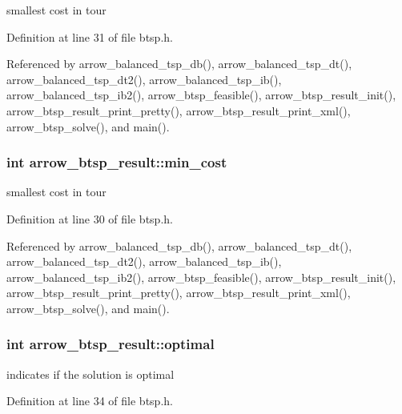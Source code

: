 smallest cost in tour 

Definition at line 31 of file btsp.h.

Referenced by arrow\_\-balanced\_\-tsp\_\-db(), arrow\_\-balanced\_\-tsp\_\-dt(), arrow\_\-balanced\_\-tsp\_\-dt2(), arrow\_\-balanced\_\-tsp\_\-ib(), arrow\_\-balanced\_\-tsp\_\-ib2(), arrow\_\-btsp\_\-feasible(), arrow\_\-btsp\_\-result\_\-init(), arrow\_\-btsp\_\-result\_\-print\_\-pretty(), arrow\_\-btsp\_\-result\_\-print\_\-xml(), arrow\_\-btsp\_\-solve(), and main().\hypertarget{structarrow__btsp__result_8c80e92a356cdd42d176a3947fcc5665}{
\subsubsection[{min\_\-cost}]{\setlength{\rightskip}{0pt plus 5cm}int {\bf arrow\_\-btsp\_\-result::min\_\-cost}}}
\label{structarrow__btsp__result_8c80e92a356cdd42d176a3947fcc5665}


smallest cost in tour 

Definition at line 30 of file btsp.h.

Referenced by arrow\_\-balanced\_\-tsp\_\-db(), arrow\_\-balanced\_\-tsp\_\-dt(), arrow\_\-balanced\_\-tsp\_\-dt2(), arrow\_\-balanced\_\-tsp\_\-ib(), arrow\_\-balanced\_\-tsp\_\-ib2(), arrow\_\-btsp\_\-feasible(), arrow\_\-btsp\_\-result\_\-init(), arrow\_\-btsp\_\-result\_\-print\_\-pretty(), arrow\_\-btsp\_\-result\_\-print\_\-xml(), arrow\_\-btsp\_\-solve(), and main().\hypertarget{structarrow__btsp__result_febcf61e24bf277eeb7795c18bd42b8b}{
\subsubsection[{optimal}]{\setlength{\rightskip}{0pt plus 5cm}int {\bf arrow\_\-btsp\_\-result::optimal}}}
\label{structarrow__btsp__result_febcf61e24bf277eeb7795c18bd42b8b}


indicates if the solution is optimal 

Definition at line 34 of file btsp.h.

